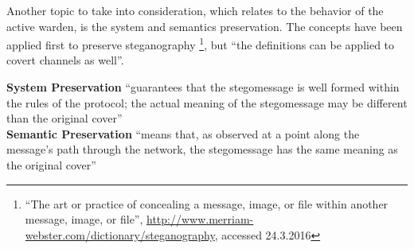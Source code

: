 \documentclass[12pt]{article}
\begin{document}
Another topic to take into consideration, which relates to the behavior of the active warden, is the system and semantics preservation. The concepts have been applied first to preserve steganography
\footnote{``The art or practice of concealing a message, image, or file within another message, image, or file'', \url{http://www.merriam-webster.com/dictionary/steganography}, accessed 24.3.2016}\cite{lucena2}, but 
``the definitions can be applied to covert channels as well''\cite{netaware}.

\textbf{System Preservation} ``guarantees that the stegomessage is well formed within the rules of the protocol; the actual meaning of the stegomessage may be different than the original cover''\cite{lucena2}\\
\textbf{Semantic Preservation} ``means that, as observed at a point along the message’s path through the network, the stegomessage has the same meaning as the original cover''\cite{lucena2}\\
\end{document}
